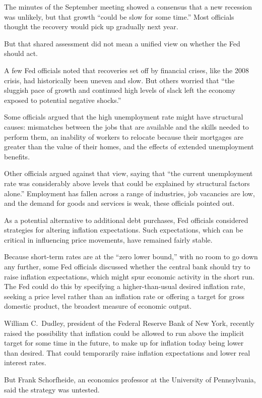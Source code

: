 ﻿\documentclass[12pt]{article}
\begin{document}
The minutes of the September meeting showed a consensus that a new recession was unlikely, but that
growth ``could be slow for some time.'' Most officials thought the recovery would pick up gradually
next year.

But that shared assessment did not mean a unified view on whether the Fed should act.

A few Fed officials noted that recoveries set off by financial crises, like the 2008 crisis, had
historically been uneven and slow. But others worried that ``the sluggish pace of growth and
continued high levels of slack left the economy exposed to potential negative shocks.''

Some officials argued that the high unemployment rate might have structural causes: mismatches
between the jobs that are available and the skills needed to perform them, an inability of workers
to relocate because their mortgages are greater than the value of their homes, and the effects of
extended unemployment benefits.

Other officials argued against that view, saying that ``the current unemployment rate was
considerably above levels that could be explained by structural factors alone.'' Employment has
fallen across a range of industries, job vacancies are low, and the demand for goods and services is
weak, these officials pointed out.

As a potential alternative to additional debt purchases, Fed officials considered strategies for
altering inflation expectations. Such expectations, which can be critical in influencing price
movements, have remained fairly stable.

Because short-term rates are at the ``zero lower bound,'' with no room to go down any further, some
Fed officials discussed whether the central bank should try to raise inflation expectations, which
might spur economic activity in the short run. The Fed could do this by specifying a
higher-than-usual desired inflation rate, seeking a price level rather than an inflation rate or
offering a target for gross domestic product, the broadest measure of economic output.

William C.~Dudley, president of the Federal Reserve Bank of New York, recently raised the
possibility that inflation could be allowed to run above the implicit target for some time in the
future, to make up for inflation today being lower than desired. That could temporarily raise
inflation expectations and lower real interest rates.

But Frank Schorfheide, an economics professor at the University of Pennsylvania, said the strategy
was untested.
\end{document}
